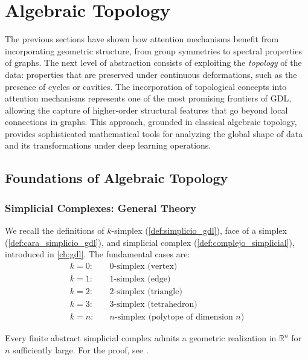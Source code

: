 \section{Algebraic Topology}

The previous sections have shown how attention mechanisms benefit from incorporating geometric structure, from group symmetries to spectral properties of graphs. The next level of abstraction consists of exploiting the \textit{topology} of the data: properties that are preserved under continuous deformations, such as the presence of cycles or cavities. The incorporation of topological concepts into attention mechanisms represents one of the most promising frontiers of \gls{GDL}, allowing the capture of higher-order structural features that go beyond local connections in graphs. This approach, grounded in classical algebraic topology, provides sophisticated mathematical tools for analyzing the global shape of data and its transformations under deep learning operations.

\subsection{Foundations of Algebraic Topology}

\subsubsection{Simplicial Complexes: General Theory}

We recall the definitions of $k$-simplex (\autoref{def:simplicio_gdl}), face of a simplex (\autoref{def:cara_simplicio_gdl}), and simplicial complex (\autoref{def:complejo_simplicial}), introduced in \autoref{ch:gdl}. The fundamental cases are:
\begin{align}
    k=0: &\quad \text{0-simplex (vertex)} \\
    k=1: &\quad \text{1-simplex (edge)} \\
    k=2: &\quad \text{2-simplex (triangle)} \\
    k=3: &\quad \text{3-simplex (tetrahedron)} \\
    k=n: &\quad \text{$n$-simplex (polytope of dimension } n\text{)}
\end{align}

\begin{theorem}\label{thm:realizacion_simplicial}
Every finite abstract simplicial complex admits a geometric realization in $\mathbb{R}^n$ for $n$ sufficiently large. For the proof, see \citep{munkres2000topology}.
\end{theorem}

